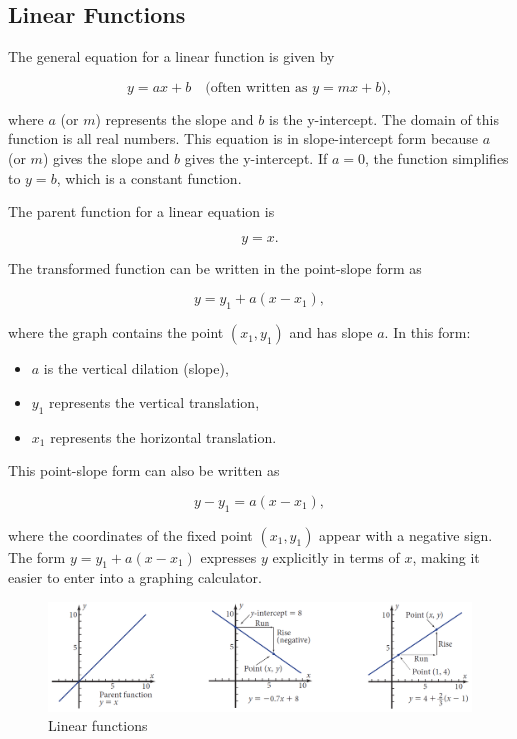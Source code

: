 \subsection*{Linear Functions}
The general equation for a linear function is given by

\[
y = ax + b \quad \text{(often written as } y = mx + b\text{)},
\]

where \(a\) (or \(m\)) represents the slope and \(b\) is the y-intercept. The domain of this function is all real numbers. This equation is in slope-intercept form because \(a\) (or \(m\)) gives the slope and \(b\) gives the y-intercept. If \(a = 0\), the function simplifies to \(y = b\), which is a constant function.

The parent function for a linear equation is

\[
y = x.
\]

The transformed function can be written in the point-slope form as

\[
y = y_1 + a(x - x_1),
\]

where the graph contains the point \((x_1, y_1)\) and has slope \(a\). In this form:
\begin{itemize}
    \item \(a\) is the vertical dilation (slope),
    \item \(y_1\) represents the vertical translation,
    \item \(x_1\) represents the horizontal translation.
\end{itemize}

This point-slope form can also be written as

\[
y - y_1 = a(x - x_1),
\]

where the coordinates of the fixed point \((x_1, y_1)\) appear with a negative sign. The form \(y = y_1 + a(x - x_1)\) expresses \(y\) explicitly in terms of \(x\), making it easier to enter into a graphing calculator.

\begin{figure}[htbp]
    \centering
    \includegraphics[width=1\textwidth]{figure/book1.png} %
    \caption{Linear functions}
    \label{fig:book_image}
\end{figure}

